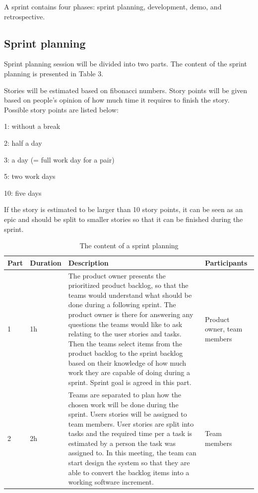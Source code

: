\documentclass{report}
\begin{document}
A sprint contains four phases: sprint planning, development, demo, and retrospective. 

\subsection{Sprint planning}

Sprint planning session will be divided into two parts. The content of the sprint planning is presented in Table 3.

Stories will be estimated based on fibonacci numbers.
Story points will be given based on people’s opinion of how much time it requires to finish the story. Possible story points are listed below:
\begin{description*}
\item[1:] without a break
\item[2:] half a day
\item[3:] a day (= full work day for a pair)
\item[5:] two work days
\item[10:] five days
\end{description*}
	
If the story is estimated to be larger than 10 story points, it can be seen as an epic and should be split to smaller stories so that it can be finished during the sprint.


\begin{table}[H]
\center
\begin{tabular}{|p{1cm}|p{2cm}|p{5cm}|p{4cm}|} 
	
\hline 
\textbf{Part} & \textbf{Duration} & \textbf{Description} & \textbf{Participants} \\ 
\hline
1 & 1h & The product owner presents the prioritized product backlog, so that the teams would understand what should be done during a following sprint. The product owner is there for answering any questions the teams would like to ask relating to the user stories and tasks. Then the teams select items from the product backlog to the sprint backlog based on their knowledge of how much work they are capable of doing during a sprint. Sprint goal is agreed in this part. & Product owner, team members \\
\hline
2 & 2h & Teams are separated to plan how the chosen work will be done during the sprint. Users stories will be assigned to team members. User stories are split into tasks and the required time per a task is estimated by a person the task was assigned to. In this meeting, the team can start design the system so that they are able to convert the backlog items into a working software increment. & Team members \\
\hline
\end{tabular} 
\caption{The content of a sprint planning}
\label{table:Sprintplanning}
\end{table}
\end{document}
